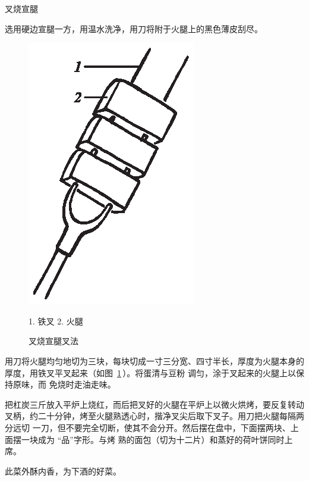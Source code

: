 \begin{recipe}{叉烧宣腿}

\ingredients


\preparation

\step 选用硬边宣腿一方，用温水洗净，用刀将附于火腿上的黑色薄皮刮尽。

\begin{figure}%
\begin{center}%
\vspace{-1.875\baselineskip}%
\includegraphics[scale=1]{illustration-011.eps}%
\vspace{-.625\baselineskip}%
\caption{叉烧宣腿叉法}
\label{method of fork roasting ham}%
\begingroup%
\small%
\noindent%
\null\hspace{0em}1. 铁叉 2. 火腿
\endgroup%
\end{center}%
\end{figure}

\step 用刀将火腿均匀地切为三块，每块切成一寸三分宽、四寸半长，厚度为火腿本身的
厚度，用铁叉平叉起来（如图~\ref{method of fork roasting ham}\,）。将蛋清与豆粉
调匀，涂于叉起来的火腿上以保持原味，而 免烧时走油走味。

\step 把杠炭三斤放入平炉上烧红，而后把叉好的火腿在平炉上以微火烘烤，要反复转动
叉柄，约二十分钟，烤至火腿熟透心时，揩净叉尖后取下叉子。用刀把火腿每隔两分远切
一刀，但不要完全切断，使其不会分开。然后摆在盘中，下面摆两块、上面摆一块成为
“品”字形。与烤 熟的面包（切为十二片）和蒸好的荷叶饼同时上席。

\features

此菜外酥内香，为下酒的好菜。

\end{recipe}

